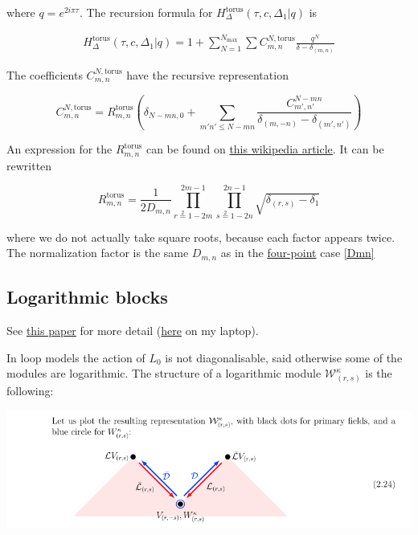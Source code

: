 \documentclass[a4paper]{article}
\numberwithin{equation}{section}
\begin{document}
where \(q=e^{2i\pi \tau}\).
The recursion formula for \(H^{\text{torus}}_{\Delta}(\tau, c, \Delta_{1} | q)\) is

\begin{align}
  H_{\Delta}^{\text{torus}} (\tau, c, \Delta_{1} | q) = 1 + \sum_{N=1}^{N_{\text{max}}}\sum C^{N, \text{torus}}_{m,n} \frac{q^N}{\delta - \delta_{(m,n)}}
\end{align}

The coefficients \(C_{m,n}^{N,\text{torus}}\) have the recursive representation

\begin{equation}
\label{CNmn-torus}
C^{N,\text{torus}}_{m,n} = R^{\text{torus}}_{m,n}\left(\delta_{N-mn,0} + \sum_{m'n'\leq N-mn} \frac{C^{N-mn}_{m',n'}}{\delta_{(m,-n)}-\delta_{(m',n')}} \right)
\end{equation}

An expression for the \(R_{m,n}^{\text{torus}}\) can be found on \href{https://en.wikipedia.org/wiki/Virasoro\_conformal\_block}{this wikipedia article}. It can be rewritten

\[
R_{m,n}^{\text{torus}} = \frac{1}{2 D_{m,n}} \prod_{r\overset2=1-2m}^{2m-1} \prod_{s\overset2=1-2n}^{2n-1} \sqrt{\delta_{(r,s)} - \delta_1}
\]

where we do not actually take square roots, because each factor appears twice. The normalization factor is the same \(D_{m,n}\) as in the \hyperref[Dmn]{four-point} case \ref{Dmn}
\subsection{Logarithmic blocks}
\label{sec:orgdea4174}

See \href{https://arxiv.org/abs/2007.04190}{this paper} for more detail (\href{file:///Users/Paul/Downloads/log\_CFT\_ribault\_nivesvivat.pdf}{here} on my laptop).

In loop models the action of \(L_0\) is not diagonalisable, said otherwise some of the modules are logarithmic.
The structure of a logarithmic module \(\mathcal W^\kappa_{(r,s)}\) is the following:

\begin{center}
\includegraphics[width=.9\linewidth]{./imgs/logarithmic_module.png}
\end{center}
\end{document}
